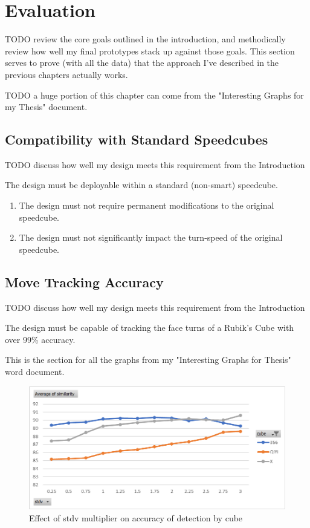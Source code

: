 
\chapter{Evaluation} %

\label{Chapter7} %

TODO review the core goals outlined in the introduction, and methodically review how well my final prototypes stack up against those goals. This section serves to prove (with all the data) that the approach I've described in the previous chapters actually works.

TODO a huge portion of this chapter can come from the "Interesting Graphs for my Thesis" document.


\section{Compatibility with Standard Speedcubes}

TODO discuss how well my design meets this requirement from the Introduction

The design must be deployable within a standard (non-smart) speedcube.
\begin{enumerate} 
    \item The design must not require permanent modifications to the original speedcube.
    \item The design must not significantly impact the turn-speed of the original speedcube.
\end{enumerate}


\section{Move Tracking Accuracy}

TODO discuss how well my design meets this requirement from the Introduction

The design must be capable of tracking the face turns of a Rubik's Cube with over 99\% accuracy.

This is the section for all the graphs from my "Interesting Graphs for Thesis" word document.

\begin{figure}[h]
    \centering
    \caption{Effect of stdv multiplier on accuracy of detection by cube}
    \label{fig:similarity-by-cube}
    \includegraphics[width=0.75\linewidth]{Figures/7 Evaluation/similarity_by_cube.png}
\end{figure}

